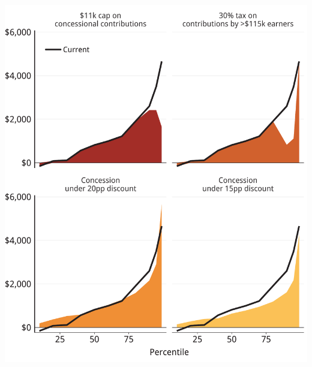 \documentclass[tikz]{standalone}\usepackage[]{graphicx}\usepackage[]{color}
\newenvironment{knitrout}{}{} %
\begin{document}
\begin{knitrout}
\color{fgcolor}
\includegraphics[width=11.000in,height=13in]{./Super-tax-targeting/b5-super-atlas/Figure4-8-1} 

\end{knitrout}
\end{document}
